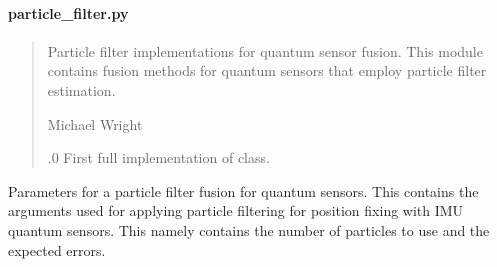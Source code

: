 \documentclass[letterpaper,10pt,english]{sphinxmanual}
\begin{document}
\paragraph{particle\_filter.py}
\label{\detokenize{modules/quantum/particle_filter:particle-filter-py}}\begin{quote}\begin{description}
\sphinxAtStartPar
Particle filter implementations for quantum sensor fusion.
This module contains fusion methods for quantum sensors that employ
particle filter estimation.

\sphinxAtStartPar
Michael Wright \sphinxhyphen{} 

.0 \sphinxhyphen{} First full implementation of class.

\end{description}\end{quote}

\begin{fulllineitems}
\label{\detokenize{modules/quantum/particle_filter:qnav.quantum.particle_filter.ParticleFilterParams}}
\pysigstartsignatures
{}
\pysigstopsignatures
\sphinxAtStartPar
Parameters for a particle filter fusion for quantum sensors.
This contains the arguments used for applying particle filtering for
position fixing with IMU quantum sensors. This namely contains the
number of particles to use and the expected errors.

\end{fulllineitems}
\end{document}
